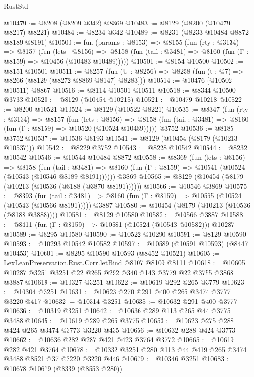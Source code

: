 \begin{lexlean}{RustStd}
\begin{coremodule}
@10479 := @8208 (@8209 @342) @8869
@10483 := @8129 (@8200 (@10479 @8217) @8221)
@10484 := @8234 @342
@10489 := @8231 (@8233 @10484 @8872 @8189 @8191)
@10500 := fun (params : @8153) =>
  @8155
    (fun (rty : @3134) =>
    @8157
      (fun (lets : @8156) =>
      @8158 (fun (tail : @3481) => @8160 (fun (Γ : @8159) => @10456 (@10483 @10489)))))
@10501 := @8154 @10500
@10502 := @8151 @10501
@10511 := @8257 (fun (U : @8256) => @8258 (fun (t : @7) => @8266 (@8129 (@8272 @8869 @8147) @8283)))
@10514 := @10476 (@10502 @10511) @8867
@10516 := @8114 @10501 @10511
@10518 := @8344 @10500 @3733
@10520 := @8129 (@10454 @10215)
@10521 := @10479 @10218
@10522 := @8200 @10521
@10524 := @8129 (@10522 @8221)
@10535 := @8347
    (fun (rty : @3134) =>
    @8157
      (fun (lets : @8156) =>
      @8158 (fun (tail : @3481) => @8160 (fun (Γ : @8159) => @10520 (@10524 @10489)))))
    @3752
@10536 := @8185 @3752
@10537 := @10536 @8193
@10541 := @8129 (@10454 (@8179 (@10213 @10537)))
@10542 := @8229 @3752
@10543 := @8228 @10542
@10544 := @8232 @10542
@10546 := @10544 @10484 @8872
@10558 := @8369
    (fun (lets : @8156) =>
    @8158
      (fun (tail : @3481) =>
      @8160 (fun (Γ : @8159) => @10541 (@10524 (@10543 (@10546 @8189 @8191))))))
    @3869
@10565 := @8129 (@10454 (@8179 (@10213 (@10536 (@8188 (@3870 @8191))))))
@10566 := @10546 @3869
@10575 := @8393
    (fun (tail : @3481) => @8160 (fun (Γ : @8159) => @10565 (@10524 (@10543 (@10566 @8191)))))
    @3887
@10580 := @10454 (@8179 (@10213 (@10536 (@8188 @3888))))
@10581 := @8129 @10580
@10582 := @10566 @3887
@10588 := @8411 (fun (Γ : @8159) => @10581 (@10524 (@10543 @10582))) @10287
@10589 := @8295 @10580
@10590 := @10522 @10290
@10591 := @8129 @10590
@10593 := @10293 @10542 @10582
@10597 := @10589 (@10591 @10593) (@8447 @10453)
@10601 := @8295 @10590 @10593 (@8452 @10521)
@10605 := LexLeanPreservation.Rust.Corr.letBind @8107 @8109 @8111
@10618 := @10605 @10287 @3251 @3251 @22 @265 @292 @340 @143 @3779 @22 @3755 @3868 @3887
@10619 := @10327 @3251
@10622 := @10619 @292 @265 @3779
@10623 := @10304 @3251
@10631 := @10623 @270 @291 @400 @265 @3474 @3777 @3220 @417
@10632 := @10314 @3251
@10635 := @10632 @291 @400 @3777
@10636 := @10319 @3251
@10642 := @10636 @289 @113 @265 @44 @3775 @3488
@10645 := @10619 @289 @265 @3775
@10653 := @10623 @275 @288 @424 @265 @3474 @3773 @3220 @435
@10656 := @10632 @288 @424 @3773
@10662 := @10636 @282 @287 @421 @423 @3764 @3772
@10665 := @10619 @282 @421 @3764
@10678 := @10332 @3251 @280 @113 @44 @419 @265 @3474 @3488 @8521 @37 @3220 @3220 @446
@10679 := @10346 @3251
@10683 := @10678 @10679 (@8339 (@8553 @280))

\end{coremodule}
\end{lexlean}
